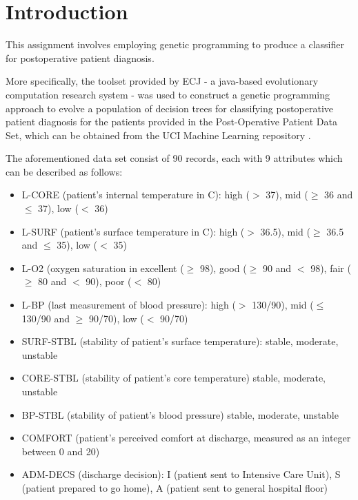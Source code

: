 \section{Introduction}
This assignment involves employing genetic programming to produce a classifier for postoperative patient diagnosis.

More specifically, the toolset provided by ECJ \cite{luke2006ecj} - a java-based evolutionary computation research system - was used to construct a genetic programming approach to evolve a population of decision trees for classifying postoperative patient diagnosis for the patients provided in the Post-Operative Patient Data Set, which can be obtained from the UCI Machine Learning repository \cite{Dua:2019}.

The aforementioned data set consist of 90 records, each with 9 attributes which can be described as follows:

\begin{itemize}
    \item L-CORE (patient's internal temperature in C):
              high ($>$ 37), mid ($\geq$ 36 and $\leq$ 37), low ($<$ 36)
    \item L-SURF (patient's surface temperature in C):
              high ($>$ 36.5), mid ($\geq$ 36.5 and $\leq$ 35), low ($<$ 35)
    \item L-O2 (oxygen saturation in %
              excellent ($\geq$ 98), good ($\geq$ 90 and $<$ 98),
              fair ($\geq$ 80 and $<$ 90), poor ($<$ 80)
    \item L-BP (last measurement of blood pressure):
              high ($>$ 130/90), mid ($\leq$ 130/90 and $\geq$ 90/70), low ($<$ 90/70)
    \item SURF-STBL (stability of patient's surface temperature):
              stable, moderate, unstable
    \item CORE-STBL (stability of patient's core temperature)
              stable, moderate, unstable
    \item BP-STBL (stability of patient's blood pressure)
              stable, moderate, unstable
    \item COMFORT (patient's perceived comfort at discharge, measured as
              an integer between 0 and 20)
    \item ADM-DECS (discharge decision):
              I (patient sent to Intensive Care Unit),
              S (patient prepared to go home),
              A (patient sent to general hospital floor)
\end{itemize}

